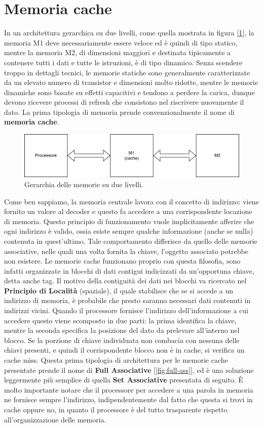 \section{Memoria cache}
In un architettura gerarchica su due livelli, come quella mostrata in figura [\ref{fig:2livmem}], la memoria M1 deve necessariamente essere veloce ed è quindi di tipo statico, mentre la memoria M2, di dimensioni maggiori e destinata tipicamente a contenere tutti i dati e tutte le istruzioni, è di tipo dinamico. Senza scendere troppo in dettagli tecnici, le memorie statiche sono generalmente caratterizzate da un elevato numero di transistor e dimensioni molto ridotte, mentre le memorie dinamiche sono basate su effetti capacitivi e tendono a perdere la carica, dunque devono ricevere processi di refresh che consistono nel riscrivere nuovamente il dato. La prima tipologia di memoria prende convenzionalmente il nome di \textbf{memoria cache}.
\begin{figure}[!h]
    \centering
    \includegraphics[width=0.6\linewidth]{img/2liv_mem.png}
    \caption{Gerarchia delle memorie su due livelli.}
    \label{fig:2livmem}
\end{figure}

Come ben sappiamo, la memoria centrale lavora con il concetto di indirizzo: viene fornito un valore al decoder e questo fa accedere a una corrispondente locazione di memoria. Questo principio di funzionamento vuole implicitamente afferire che ogni indirizzo è valido, ossia esiste sempre qualche informazione (anche se nulla) contenuta in quest'ultimo. Tale comportamento differisce da quello delle memorie associative, nelle quali una volta fornita la chiave, l'oggetto associato potrebbe non esistere. Le memorie cache funzionano proprio con questa filosofia, sono infatti organizzate in blocchi di dati contigui indicizzati da un'opportuna chiave, detta anche tag. Il motivo della contiguità dei dati nei blocchi va ricercato nel \textbf{Principio di Località} (spaziale), il quale stabilisce che se si accede a un indirizzo di memoria, è probabile che presto saranno necessari dati contenuti in indirizzi vicini. Quando il processore fornisce l'indirizzo dell'informazione a cui accedere questo viene scomposto in due parti: la prima identifica la chiave, mentre la seconda specifica la posizione del dato da prelevare all'interno nel blocco. Se la porzione di chiave individuata non combacia con nessuna delle chiavi presenti, e quindi il corrispondente blocco non è in cache, si verifica un cache miss. Questa prima tipologia di architettura per le memorie cache presentate prende il nome di \textbf{Full Associative} [\ref{fig:full-ass}], ed è una soluzione leggermente più semplice di quella \textbf{Set Associative} presentata di seguito. \MakeUppercase{è} molto importante notare che il processore per accedere a una parola in memoria ne fornisce sempre l'indirizzo, indipendentemente dal fatto che questa si trovi in cache oppure no, in quanto il processore è del tutto trasparente rispetto all'organizzazione delle memoria.

